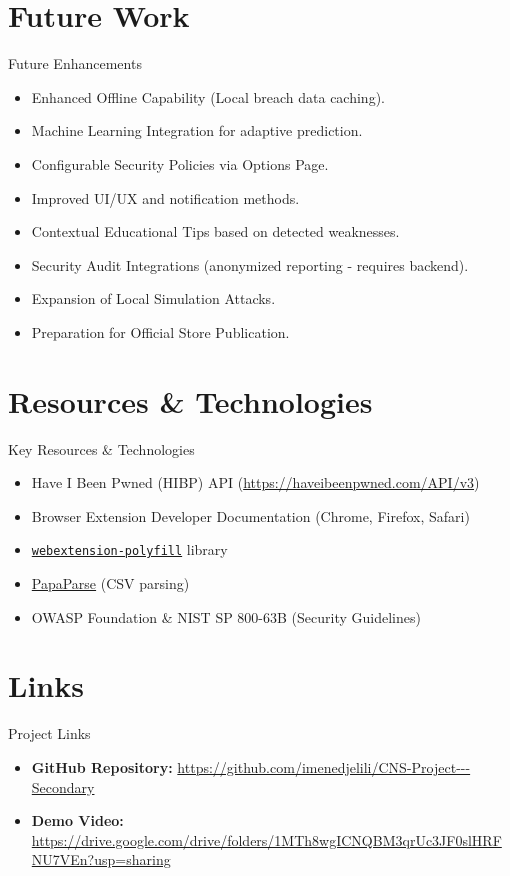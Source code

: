 \documentclass[aspectratio=169]{beamer}
\begin{document}
\section{Future Work}
\begin{frame}{Future Enhancements}
  \begin{itemize}
    \item Enhanced Offline Capability (Local breach data caching).
    \item Machine Learning Integration for adaptive prediction.
    \item Configurable Security Policies via Options Page.
    \item Improved UI/UX and notification methods.
    \item Contextual Educational Tips based on detected weaknesses.
    \item Security Audit Integrations (anonymized reporting - requires backend).
    \item Expansion of Local Simulation Attacks.
    \item Preparation for Official Store Publication.
  \end{itemize}
\end{frame}

 \section{Resources \& Technologies}
 \begin{frame}{Key Resources \& Technologies}
   \begin{itemize}
     \item Have I Been Pwned (HIBP) API (\url{https://haveibeenpwned.com/API/v3})
     \item Browser Extension Developer Documentation (Chrome, Firefox, Safari)
     \item \href{https://github.com/mozilla/webextension-polyfill}{\texttt{webextension-polyfill}} library
     \item \href{https://www.papaparse.com/}{PapaParse} (CSV parsing)
     \item OWASP Foundation \& NIST SP 800-63B (Security Guidelines)
   \end{itemize}
 \end{frame}

\section{Links}
\begin{frame}{Project Links}
  \begin{itemize}
    \item \textbf{GitHub Repository:} \url{https://github.com/imenedjelili/CNS-Project---Secondary}
    \item \textbf{Demo Video:} \url{https://drive.google.com/drive/folders/1MTh8wgICNQBM3qrUc3JF0slHRFNU7VEn?usp=sharing} 
  \end{itemize}
  \vspace{1em}
\end{frame}
\end{document}
